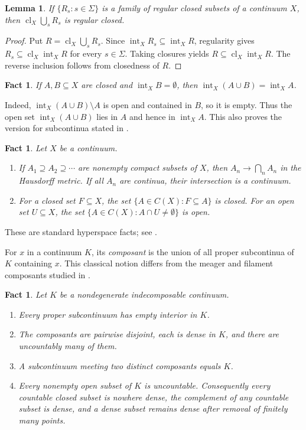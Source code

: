 \documentclass[11pt]{amsart}
\newtheorem{lemma}[theorem]{Lemma}
\newtheorem{fact}[theorem]{Fact}
\theoremstyle{definition}
\theoremstyle{remark}
\newcommand{\clX}{\operatorname{cl}_X}
\newcommand{\intX}{\operatorname{int}_X}
\begin{document}
\begin{lemma}\label{lem:regular-closed}
If $\{R_s:s\in\Sigma\}$ is a family of regular closed subsets of a continuum $X$, then $\clX\bigcup_s R_s$ is regular closed.
\end{lemma}

\begin{proof}
Put $R=\clX\bigcup_s R_s$. Since $\intX R_s\subseteq\intX R$, regularity gives $R_s\subseteq\clX\intX R$ for every $s\in\Sigma$. Taking closures yields $R\subseteq\clX\intX R$. The reverse inclusion follows from closedness of $R$.
\end{proof}

\begin{fact}\label{fact:meager}
If $A,B\subseteq X$ are closed and $\intX B=\emptyset$, then $\intX(A\cup B)=\intX A$.
\end{fact}

Indeed, $\intX(A\cup B)\setminus A$ is open and contained in $B$, so it is empty. Thus the open set $\intX(A\cup B)$ lies in $A$ and hence in $\intX A$. This also proves the version for subcontinua stated in \cite[Lemma~6.3]{Or21}.

\begin{fact}\label{fact:hyperspace}
Let $X$ be a continuum.
\begin{enumerate}[label=\textup{(\alph*)}]
\item If $A_1\supseteq A_2\supseteq\cdots$ are nonempty compact subsets of $X$, then $A_n\to\bigcap_nA_n$ in the Hausdorff metric. If all $A_n$ are continua, their intersection is a continuum.
\item For a closed set $F\subseteq X$, the set $\{A\in C(X): F\subseteq A\}$ is closed. For an open set $U\subseteq X$, the set $\{A\in C(X): A\cap U\neq\emptyset\}$ is open.
\end{enumerate}
\end{fact}

These are standard hyperspace facts; see \cite{IN,Na}.

For $x$ in a continuum $K$, its \emph{composant} is the union of all proper subcontinua of $K$ containing $x$. This classical notion differs from the meager and filament composants studied in \cite{CORa}.

\begin{fact}\label{fact:indec}
Let $K$ be a nondegenerate indecomposable continuum.
\begin{enumerate}[label=\textup{(\alph*)}]
\item Every proper subcontinuum has empty interior in $K$.
\item The composants are pairwise disjoint, each is dense in $K$, and there are uncountably many of them.
\item A subcontinuum meeting two distinct composants equals $K$.
\item Every nonempty open subset of $K$ is uncountable. Consequently every countable closed subset is nowhere dense, the complement of any countable subset is dense, and a dense subset remains dense after removal of finitely many points.
\end{enumerate}
\end{fact}
\end{document}
